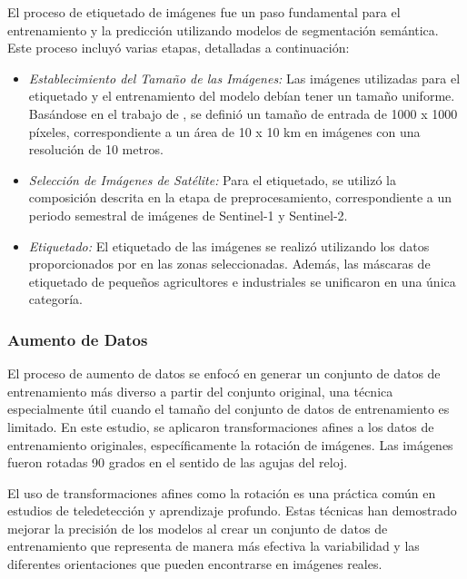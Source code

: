 El proceso de etiquetado de imágenes fue un paso fundamental para el entrenamiento y la predicción utilizando modelos de segmentación semántica. Este proceso incluyó varias etapas, detalladas a continuación:

\begin{itemize} 

    \item \textit{Establecimiento del Tamaño de las Imágenes:} Las imágenes utilizadas para el etiquetado y el entrenamiento del modelo debían tener un tamaño uniforme. Basándose en el trabajo de \cite{descals2021}, se definió un tamaño de entrada de 1000 x 1000 píxeles, correspondiente a un área de 10 x 10 km en imágenes con una resolución de 10 metros.

    \item \textit{Selección de Imágenes de Satélite:} Para el etiquetado, se utilizó la composición descrita en la etapa de preprocesamiento, correspondiente a un periodo semestral de imágenes de Sentinel-1 y Sentinel-2.

    \item \textit{Etiquetado:} El etiquetado de las imágenes se realizó utilizando los datos proporcionados por \cite{descals2021} en las zonas seleccionadas. Además, las máscaras de etiquetado de pequeños agricultores e industriales se unificaron en una única categoría.

\end{itemize}

\subsubsection{Aumento de Datos}

El proceso de aumento de datos se enfocó en generar un conjunto de datos de entrenamiento más diverso a partir del conjunto original, una técnica especialmente útil cuando el tamaño del conjunto de datos de entrenamiento es limitado. En este estudio, se aplicaron transformaciones afines a los datos de entrenamiento originales, específicamente la rotación de imágenes. Las imágenes fueron rotadas 90 grados en el sentido de las agujas del reloj.

El uso de transformaciones afines como la rotación es una práctica común en estudios de teledetección y aprendizaje profundo. Estas técnicas han demostrado mejorar la precisión de los modelos al crear un conjunto de datos de entrenamiento que representa de manera más efectiva la variabilidad y las diferentes orientaciones que pueden encontrarse en imágenes reales.

